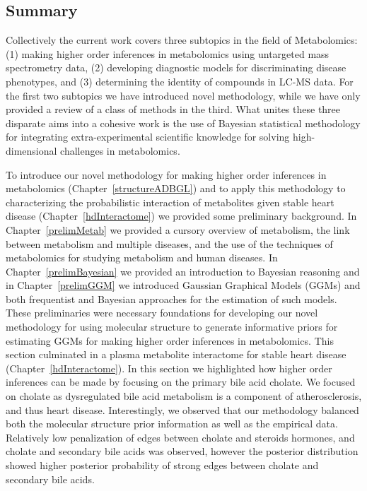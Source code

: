 \label{conclusions}
\begin{DoubleSpace*}
\section{Summary}
Collectively the current work covers three subtopics in the field of Metabolomics: (1) making higher order inferences in metabolomics using untargeted mass spectrometry data, (2) developing diagnostic models for discriminating disease phenotypes, and (3) determining the identity of compounds in LC-MS data. For the first two subtopics we have introduced novel methodology, while we have only provided a review of a class of methods in the third. What unites these three disparate aims into a cohesive work is the use of Bayesian statistical methodology for integrating extra-experimental scientific knowledge for solving high-dimensional challenges in metabolomics.

To introduce our novel methodology for making higher order inferences in metabolomics (Chapter~\ref{structureADBGL}) and to apply this methodology to characterizing the probabilistic interaction of metabolites given stable heart disease (Chapter~\ref{hdInteractome}) we provided some preliminary background. In Chapter~\ref{prelimMetab} we provided a cursory overview of metabolism, the link between metabolism and multiple diseases, and the use of the techniques of metabolomics for studying metabolism and human diseases. In Chapter~\ref{prelimBayesian} we provided an introduction to Bayesian reasoning and in Chapter~\ref{prelimGGM} we introduced Gaussian Graphical Models (GGMs) and both frequentist and Bayesian approaches for the estimation of such models. These preliminaries were necessary foundations for developing our novel methodology for using molecular structure to generate informative priors for estimating GGMs for making higher order inferences in metabolomics. This section culminated in a plasma metabolite interactome for stable heart disease (Chapter~\ref{hdInteractome}). In this section we highlighted how higher order inferences can be made by focusing on the primary bile acid cholate. We focused on cholate as dysregulated bile acid metabolism is a component of atherosclerosis, and thus heart disease. Interestingly, we observed that our methodology balanced both the molecular structure prior information as well as the empirical data. Relatively low penalization of edges between cholate and steroids hormones, and cholate and secondary bile acids was observed, however the posterior distribution showed higher posterior probability of strong edges between cholate and secondary bile acids.


\end{DoubleSpace*}
